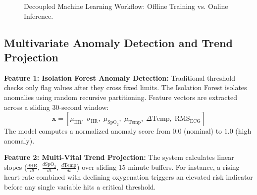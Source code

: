 \documentclass[12pt]{article}
\begin{document}
\begin{figure}[htbp]
\begin{tcolorbox}[tikzbox, title={Decoupled Machine Learning Architecture: Offline Training vs. Online Inference}, width=\linewidth]
{%
}
\end{tcolorbox}
\vspace{-0.2cm}
\caption{Decoupled Machine Learning Workflow: Offline Training vs. Online Inference.}
\label{fig:ml_workflow}
\end{figure}

\subsection{Multivariate Anomaly Detection and Trend Projection}
\textbf{Feature 1: Isolation Forest Anomaly Detection:} Traditional threshold checks only flag values after they cross fixed limits. The Isolation Forest isolates anomalies using random recursive partitioning. Feature vectors are extracted across a sliding 30-second window:
\begin{equation}
    \mathbf{x} = \left[ \mu_{\text{HR}}, \; \sigma_{\text{HR}}, \; \mu_{\text{SpO}_2}, \; \mu_{\text{Temp}}, \; \Delta \text{Temp}, \; \text{RMS}_{\text{ECG}} \right]
\end{equation}
The model computes a normalized anomaly score from $0.0$ (nominal) to $1.0$ (high anomaly).

\textbf{Feature 2: Multi-Vital Trend Projection:} The system calculates linear slopes ($\frac{d\text{HR}}{dt}$, $\frac{d\text{SpO}_2}{dt}$, $\frac{d\text{Temp}}{dt}$) over sliding 15-minute buffers. For instance, a rising heart rate combined with declining oxygenation triggers an elevated risk indicator before any single variable hits a critical threshold.
\clearpage
\end{document}
